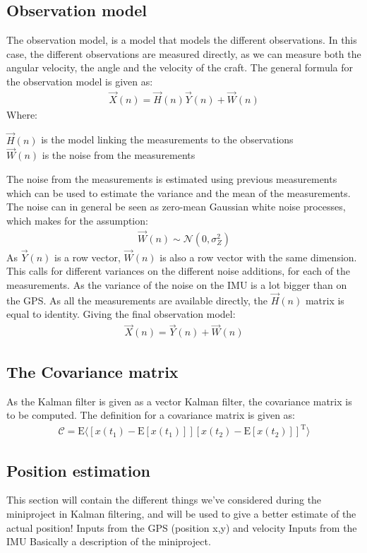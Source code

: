 \subsection{Observation model}
The observation model, is a model that models the different observations. In this case, the different observations are measured directly, as we can measure both the angular velocity, the angle and the velocity of the craft. The general formula for the observation model is given as:
\begin{align}
\vec{X}(n) = \vec{H}(n)\vec{Y}(n) + \vec{W}(n)
\end{align}
\noindent Where:
\begin{ffk}
$\vec{H}(n)$ is the model linking the measurements to the observations\\
$\vec{W}(n)$ is the noise from the measurements
\end{ffk}
The noise from the measurements is estimated using previous measurements which can be used to estimate the variance and the mean of the measurements. The noise can in general be seen as zero-mean Gaussian white noise processes, which makes for the assumption:
\begin{align}
\vec{W}(n) \sim \mathcal{N}(0,\sigma_Z^2)
\end{align}
As $\vec{Y}(n)$ is a row vector, $\vec{W}(n)$ is also a row vector with the same dimension. This calls for different variances on the different noise additions, for each of the measurements. As the variance of the noise on the \ac{IMU} is a lot bigger than on the \ac{GPS}. As all the measurements are available directly, the $\vec{H}(n)$ matrix is equal to identity. Giving the final observation model:
\begin{align}
\vec{X}(n) = \vec{Y}(n) + \vec{W}(n)
\end{align}


\subsection{The Covariance matrix}
As the Kalman filter is given as a vector Kalman filter, the covariance matrix is to be computed. The definition for a covariance matrix is given as:
\begin{align}
\mathcal{C} = \text{E}\langle[x(t_1) - \text{E}[x(t_1)]][x(t_2) - \text{E}[x(t_2)]]^\text{T}\rangle
\end{align}

\subsection{Position estimation}
This section will contain the different things we've considered during the miniproject in Kalman filtering, and will be used to give a better estimate of the actual position!
Inputs from the \ac{GPS} (position x,y) and velocity
Inputs from the \ac{IMU}
Basically a description of the miniproject. 